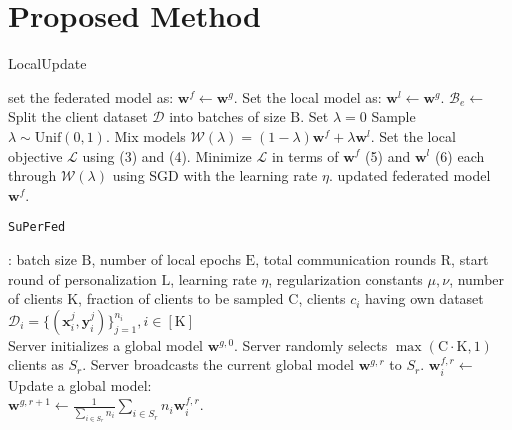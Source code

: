 \documentclass[sigconf]{acmart}
\begin{document}
\section{Proposed Method}
\begin{algorithm}[!tb]
\caption{LocalUpdate}
\label{alg:LocalUpdate}
\begin{algorithmic}
 set the federated model as: $\mathbf{w}^f\leftarrow\mathbf{w}^g$.
\STATE Set the local model as: $\mathbf{w}^l\leftarrow\mathbf{w}^g$.
\ENDIF
{}
\STATE $\mathcal{B}_e\leftarrow$Split the client dataset $\mathcal{D}$ into batches of size $\mathrm{B}$.
\STATE Set $\lambda=0$
\ELSE
\STATE Sample $\lambda \sim \text{Unif}(0,1)$.
\ENDIF
\STATE Mix models $\mathcal{W}(\lambda)=(1-\lambda)\mathbf{w}^f+\lambda\mathbf{w}^l$.
\STATE Set the local objective $\mathcal{L}$ using (3) and (4).
\STATE Minimize $\mathcal{L}$ in terms of $\mathbf{w}^f$ (5) and $\mathbf{w}^l$ (6) each through $\mathcal{W}(\lambda)$ using SGD with the learning rate $\eta$.
\ENDFOR
\ENDFOR
{} updated federated model $\mathbf{w}^f$.
\end{algorithmic}
\end{algorithm}
\begin{algorithm}[!tb]
\caption{\texttt{SuPerFed}}
\label{alg:SuPerFed}
\begin{algorithmic}
: batch size $\mathrm{B}$, number of local epochs $\mathrm{E}$, total communication rounds $\mathrm{R}$, start round of personalization $\mathrm{L}$, learning rate $\eta$, regularization constants $\mu, \nu$, number of clients $\mathrm{K}$, fraction of clients to be sampled $\mathrm{C}$, clients $c_i$ having own dataset $\mathcal{D}_i=\{(\mathbf{x}_i^j,\mathbf{y}_i^j)\}_{j=1}^{n_i}, i\in[\mathrm{K}]$ \\ 
 Server initializes a global model $\mathbf{w}^{g, 0}$.
\STATE Server randomly selects $\max(\mathrm{C}\cdot\mathrm{K}, 1)$ clients as $S_r$.
\STATE Server broadcasts the current global model $\mathbf{w}^{g,r}$ to $S_r$.
    \STATE $\mathbf{w}^{f, r}_i\leftarrow$ 
\ENDFOR
\STATE Update a global model: \\
$\mathbf{w}^{g, r+1}\leftarrow\frac{1}{\sum_{i\in S_r}{n_i}}\sum_{i\in S_r}{n_i}\mathbf{w}_i^{f, r}$.
\ENDFOR
\end{algorithmic}
\end{algorithm}
\end{document}
